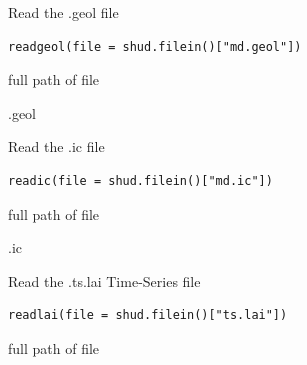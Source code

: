 \documentclass[a4paper]{book}
\begin{document}
%
\begin{Description}\relax
Read the .geol file
\end{Description}
%
\begin{Usage}
\begin{verbatim}
readgeol(file = shud.filein()["md.geol"])
\end{verbatim}
\end{Usage}
%
\begin{Arguments}
\begin{ldescription}
\item[\code{file}] full path of file
\end{ldescription}
\end{Arguments}
%
\begin{Value}
.geol
\end{Value}
%
\begin{Description}\relax
Read the .ic file
\end{Description}
%
\begin{Usage}
\begin{verbatim}
readic(file = shud.filein()["md.ic"])
\end{verbatim}
\end{Usage}
%
\begin{Arguments}
\begin{ldescription}
\item[\code{file}] full path of file
\end{ldescription}
\end{Arguments}
%
\begin{Value}
.ic
\end{Value}
%
\begin{Description}\relax
Read the .ts.lai Time-Series file
\end{Description}
%
\begin{Usage}
\begin{verbatim}
readlai(file = shud.filein()["ts.lai"])
\end{verbatim}
\end{Usage}
%
\begin{Arguments}
\begin{ldescription}
\item[\code{file}] full path of file
\end{ldescription}
\end{Arguments}
\end{document}

